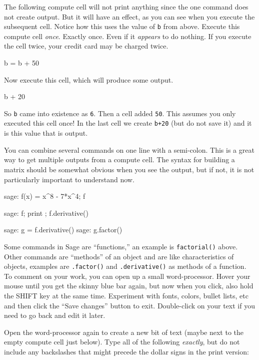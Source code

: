 %
The following compute cell will not print anything since the one command does not create output.  But it will have an effect, as you can see when you execute the subsequent cell.  Notice how this uses the value of \verb?b? from above.  Execute this compute cell \emph{once}.  Exactly once.  Even if it \emph{appears} to do nothing.  If you execute the cell twice, your credit card may be charged twice.
%
\begin{sageexample}
b = b + 50
\end{sageexample}
%
Now execute this cell, which will produce some output.
%
\begin{sageexample}
b + 20
\end{sageexample}
%
So \verb?b? came into existence as \verb?6?.  Then a cell added \verb?50?.  This assumes you only executed this cell once!  In the last cell we create \verb?b+20? (but do not save it) and it is this value that is output.\par
%
You can combine several commands on one line with a semi-colon.  This is a great way to get multiple outputs from a compute cell.  The syntax for building a matrix should be somewhat obvious when you see the output, but if not, it is not particularly important to understand now.
%
\begin{sageexample}
sage: f(x) = x^8 - 7*x^4; f
\end{sageexample}
%
\begin{sageexample}
sage: f; print ; f.derivative()
\end{sageexample}
%
\begin{sageexample}
sage: g = f.derivative()
sage: g.factor()
\end{sageexample}
%
Some commands in Sage are ``functions,'' an example is \verb?factorial()? above.  Other commands are ``methods'' of an object and are like characteristics of objects, examples are \verb?.factor()? and \verb?.derivative()? as methods of a function.
%
To comment on your work, you can open up a small word-processor.  Hover your mouse until you get the skinny blue bar again, but now when you click, also hold the SHIFT key at the same time.  Experiment with fonts, colors, bullet lists, etc and then click the ``Save changes'' button to exit.  Double-click on your text if you need to go back and edit it later.\par
%
Open the word-processor again to create a new bit of text (maybe next to the empty compute cell just below).  Type all of the following \emph{exactly}, but do not include any backslashes that might precede the dollar signs in the print version:
